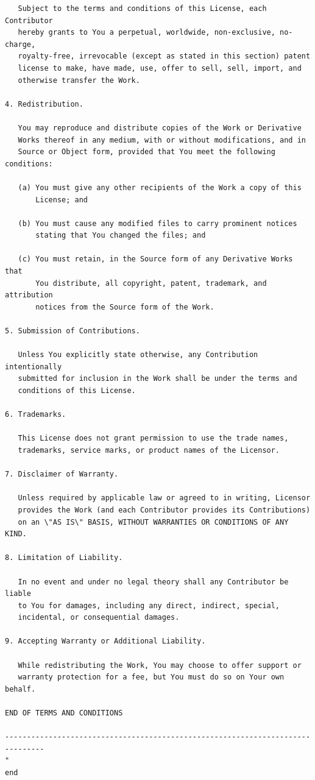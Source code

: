 \documentclass[12pt,a4paper]{article}
\theoremstyle{definition}
\theoremstyle{remark}
\begin{document}
\begin{verbatim}
   Subject to the terms and conditions of this License, each Contributor
   hereby grants to You a perpetual, worldwide, non-exclusive, no-charge,
   royalty-free, irrevocable (except as stated in this section) patent
   license to make, have made, use, offer to sell, sell, import, and
   otherwise transfer the Work.

4. Redistribution.

   You may reproduce and distribute copies of the Work or Derivative
   Works thereof in any medium, with or without modifications, and in
   Source or Object form, provided that You meet the following conditions:

   (a) You must give any other recipients of the Work a copy of this
       License; and

   (b) You must cause any modified files to carry prominent notices
       stating that You changed the files; and

   (c) You must retain, in the Source form of any Derivative Works that
       You distribute, all copyright, patent, trademark, and attribution
       notices from the Source form of the Work.

5. Submission of Contributions.

   Unless You explicitly state otherwise, any Contribution intentionally
   submitted for inclusion in the Work shall be under the terms and
   conditions of this License.

6. Trademarks.

   This License does not grant permission to use the trade names,
   trademarks, service marks, or product names of the Licensor.

7. Disclaimer of Warranty.

   Unless required by applicable law or agreed to in writing, Licensor
   provides the Work (and each Contributor provides its Contributions)
   on an \"AS IS\" BASIS, WITHOUT WARRANTIES OR CONDITIONS OF ANY KIND.

8. Limitation of Liability.

   In no event and under no legal theory shall any Contributor be liable
   to You for damages, including any direct, indirect, special,
   incidental, or consequential damages.

9. Accepting Warranty or Additional Liability.

   While redistributing the Work, You may choose to offer support or
   warranty protection for a fee, but You must do so on Your own behalf.

END OF TERMS AND CONDITIONS

-------------------------------------------------------------------------------
"
end
\end{verbatim}
\end{document}
